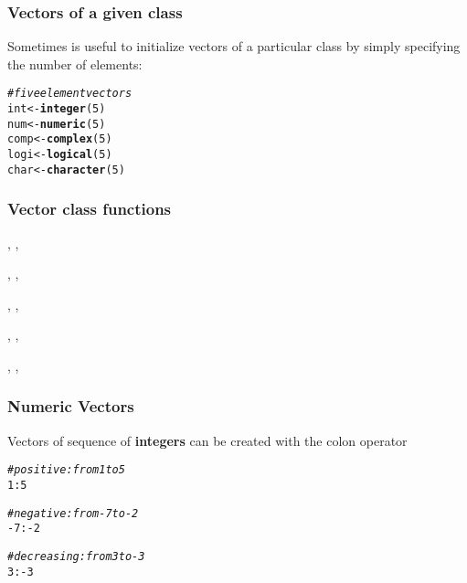 \documentclass[12pt]{beamer}\usepackage[]{graphicx}\usepackage[]{color}
\makeatletter
\newcommand{\hlnum}[1]{\textcolor[rgb]{0.686,0.059,0.569}{#1}}%
\newcommand{\hlcom}[1]{\textcolor[rgb]{0.678,0.584,0.686}{\textit{#1}}}%
\newcommand{\hlopt}[1]{\textcolor[rgb]{0,0,0}{#1}}%
\newcommand{\hlstd}[1]{\textcolor[rgb]{0.345,0.345,0.345}{#1}}%
\newcommand{\hlkwb}[1]{\textcolor[rgb]{0.69,0.353,0.396}{#1}}%
\newcommand{\hlkwd}[1]{\textcolor[rgb]{0.737,0.353,0.396}{\textbf{#1}}}%
\newenvironment{kframe}{%
 \def\at@end@of@kframe{}%
 \ifinner\ifhmode%
  \def\at@end@of@kframe{\end{minipage}}%
  \begin{minipage}{\columnwidth}%
 \fi\fi%
 \def\FrameCommand##1{\hskip\@totalleftmargin \hskip-\fboxsep
 \colorbox{shadecolor}{##1}\hskip-\fboxsep
     \hskip-\linewidth \hskip-\@totalleftmargin \hskip\columnwidth}%
 \MakeFramed {\advance\hsize-\width
   \@totalleftmargin\z@ \linewidth\hsize
   \@setminipage}}%
 {\par\unskip\endMakeFramed%
 \at@end@of@kframe}
\newenvironment{knitrout}{}{} %
\makeatother
\begin{document}

\begin{frame}[fragile]
\frametitle{Vectors of a given class}

Sometimes is useful to initialize vectors of a particular class by simply specifying the number of elements:
\begin{knitrout}\footnotesize
{}\color{fgcolor}\begin{kframe}
\begin{alltt}
\hlcom{# five element vectors }
\hlstd{int} \hlkwb{<-} \hlkwd{integer}\hlstd{(}\hlnum{5}\hlstd{)}
\hlstd{num} \hlkwb{<-} \hlkwd{numeric}\hlstd{(}\hlnum{5}\hlstd{)}
\hlstd{comp} \hlkwb{<-} \hlkwd{complex}\hlstd{(}\hlnum{5}\hlstd{)}
\hlstd{logi} \hlkwb{<-} \hlkwd{logical}\hlstd{(}\hlnum{5}\hlstd{)}
\hlstd{char} \hlkwb{<-} \hlkwd{character}\hlstd{(}\hlnum{5}\hlstd{)}
\end{alltt}
\end{kframe}
\end{knitrout}

\end{frame}


\begin{frame}[fragile]
\frametitle{Vector class functions}

\bi
  \item {}, , 
  \item {}, , 
  \item {}, , 
  \item {}, , 
  \item {}, , 
\ei

\end{frame}


\begin{frame}[fragile]
\frametitle{Numeric Vectors}

Vectors of sequence of \textbf{integers} can be created with the colon operator {\hilit {}}
\begin{knitrout}\footnotesize
{}\color{fgcolor}\begin{kframe}
\begin{alltt}
\hlcom{# positive: from 1 to 5}
\hlnum{1}\hlopt{:}\hlnum{5}

\hlcom{# negative: from -7 to -2}
\hlopt{-}\hlnum{7}\hlopt{:-}\hlnum{2}

\hlcom{# decreasing: from 3 to -3}
\hlnum{3}\hlopt{:-}\hlnum{3}
\end{alltt}
\end{kframe}
\end{knitrout}

\end{frame}
\end{document}
